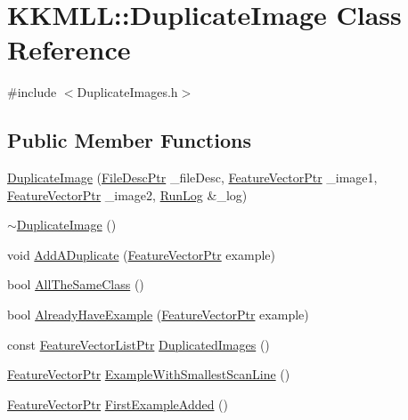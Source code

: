 \hypertarget{class_k_k_m_l_l_1_1_duplicate_image}{}\section{K\+K\+M\+LL\+:\+:Duplicate\+Image Class Reference}
\label{class_k_k_m_l_l_1_1_duplicate_image}


{\ttfamily \#include $<$Duplicate\+Images.\+h$>$}

\subsection*{Public Member Functions}
\begin{DoxyCompactItemize}
\item 
\hyperlink{class_k_k_m_l_l_1_1_duplicate_image_a95bb463959095c41903ebfa820860efe}{Duplicate\+Image} (\hyperlink{namespace_k_k_m_l_l_aa0d0b6ab4ec18868a399b8455b05d914}{File\+Desc\+Ptr} \+\_\+file\+Desc, \hyperlink{namespace_k_k_m_l_l_a0c5df3d48f45926fbc4fee04f5e3bc04}{Feature\+Vector\+Ptr} \+\_\+image1, \hyperlink{namespace_k_k_m_l_l_a0c5df3d48f45926fbc4fee04f5e3bc04}{Feature\+Vector\+Ptr} \+\_\+image2, \hyperlink{class_k_k_b_1_1_run_log}{Run\+Log} \&\+\_\+log)
\item 
\hyperlink{class_k_k_m_l_l_1_1_duplicate_image_aaab99a8e66d305b9eb3b20c092e82108}{$\sim$\+Duplicate\+Image} ()
\item 
void \hyperlink{class_k_k_m_l_l_1_1_duplicate_image_ae4f0ded72efe70cb97baf74e2f0f154b}{Add\+A\+Duplicate} (\hyperlink{namespace_k_k_m_l_l_a0c5df3d48f45926fbc4fee04f5e3bc04}{Feature\+Vector\+Ptr} example)
\item 
bool \hyperlink{class_k_k_m_l_l_1_1_duplicate_image_a0d325032b258151a62ea1b757e2862aa}{All\+The\+Same\+Class} ()
\item 
bool \hyperlink{class_k_k_m_l_l_1_1_duplicate_image_aa64e3f589f5886fbc19cfd25406c08dc}{Already\+Have\+Example} (\hyperlink{namespace_k_k_m_l_l_a0c5df3d48f45926fbc4fee04f5e3bc04}{Feature\+Vector\+Ptr} example)
\item 
const \hyperlink{namespace_k_k_m_l_l_acf2ba92a3cf03e2b19674b24ff488ef6}{Feature\+Vector\+List\+Ptr} \hyperlink{class_k_k_m_l_l_1_1_duplicate_image_ac5508ceab803834254df40c3f0d8d345}{Duplicated\+Images} ()
\item 
\hyperlink{namespace_k_k_m_l_l_a0c5df3d48f45926fbc4fee04f5e3bc04}{Feature\+Vector\+Ptr} \hyperlink{class_k_k_m_l_l_1_1_duplicate_image_aa2ee78da71de8a85c0a1b576f8e76a09}{Example\+With\+Smallest\+Scan\+Line} ()
\item 
\hyperlink{namespace_k_k_m_l_l_a0c5df3d48f45926fbc4fee04f5e3bc04}{Feature\+Vector\+Ptr} \hyperlink{class_k_k_m_l_l_1_1_duplicate_image_ab005d27fa527c46b5b15fd77945680eb}{First\+Example\+Added} ()
\end{DoxyCompactItemize}


